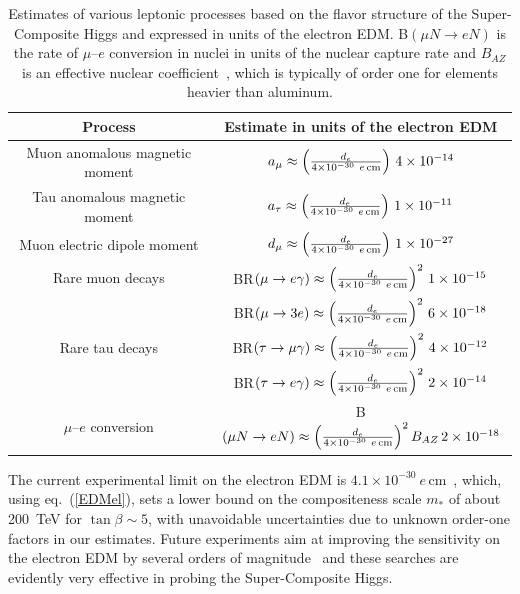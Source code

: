\documentclass[a4paper,12pt]{article}
\def\eq#1{eq.~(\ref{#1})}
\def\eq#1{eq.~(\ref{#1})}
\def\mst{m_*}
\begin{document}
\begin{table}[t]
\centering
\begin{tabular}{|c|c|}
\hline
Process & Estimate in units of the electron EDM \\
\hline
Muon anomalous magnetic moment &$a_\mu \approx \left(\frac{d_e}{4\times 10^{-30}~ e\,{\rm cm}}\right) \, 4 \times 10^{-14}$ \\
Tau anomalous magnetic moment & $a_\tau \approx \left(\frac{d_e}{4\times 10^{-30}~ e\,{\rm cm}}\right) \, 1 \times 10^{-11}$ \\
Muon electric dipole moment &$d_\mu \approx \left(\frac{d_e}{4\times 10^{-30}~ e\,{\rm cm}}\right) \, 1 \times 10^{-27}$\\
Rare muon decays & BR$(\mu \to e \gamma) \approx \left(\frac{d_e}{4\times 10^{-30}~ e\,{\rm cm}}\right)^2 \, 1 \times 10^{-15}$\\
 & BR$(\mu \to 3 e ) \approx \left(\frac{d_e}{4\times 10^{-30}~ e\,{\rm cm}}\right)^2 \, 6 \times 10^{-18}$\\
 Rare tau decays & BR$(\tau \to \mu \gamma) \approx \left(\frac{d_e}{4\times 10^{-30}~ e\,{\rm cm}}\right)^2 \, 4 \times 10^{-12}$\\
 & BR$(\tau \to e \gamma) \approx \left(\frac{d_e}{4\times 10^{-30}~ e\,{\rm cm}}\right)^2 \, 2 \times 10^{-14}$\\
 $\mu$--$e$ conversion & B$(\mu N \to e N) \approx \left(\frac{d_e}{4\times 10^{-30}~ e\,{\rm cm}}\right)^2 B_{AZ} \, 2 \times 10^{-18}$\\
\hline
\end{tabular}
\caption{Estimates of various leptonic processes based on the flavor structure of the Super-Composite Higgs and expressed in units of the electron EDM. B$(\mu N \to e N)$ is the rate of $\mu$--$e$ conversion in nuclei in units of the nuclear capture rate and $B_{AZ}$ is an effective nuclear coefficient~\cite{Haxton:2024amf}, which is typically of order one for elements heavier than aluminum.} 
\label{tab:edm}
\end{table} 

The current experimental limit on the electron EDM is $4.1 \times 10^{-30}~e\,$cm~\cite{Roussy:2022cmp}, which, using \eq{EDMel}, sets a lower bound on the compositeness scale $\mst$ of about 200~TeV for $\tan\beta \sim 5$, with unavoidable uncertainties due to unknown order-one factors in our estimates. Future experiments aim at improving the sensitivity on the electron EDM by several orders of magnitude~\cite{Alarcon:2022ero} and these searches are evidently very effective in probing the Super-Composite Higgs.
\end{document}
